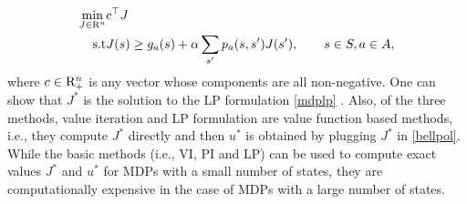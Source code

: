 \begin{align}\label{mdplp}
\min_{J\in \R^n} &c^\top J\nn\\
\text{s.t}\mb &J(s)\geq g_a(s)+\alpha\sum_{s'}p_a(s,s')J(s'), \qquad s\in S, a \in A,
\end{align}
where $c\in \mathrm{R}^n_+$ is any vector whose components are all non-negative. One can show that $J^*$ is the solution to the LP formulation \eqref{mdplp} \cite{BertB}. 
Also, of the three methods, value iteration and LP formulation are value function based methods, i.e., they compute $J^*$ directly and then $u^*$ is obtained by plugging $J^*$ in \eqref{bellpol}.\\
While the basic methods (i.e., VI, PI and LP) can be used to compute exact values $J^*$ and $u^*$ for MDPs with a small number of states, they are computationally expensive in the case of MDPs with a large number of states.\\
